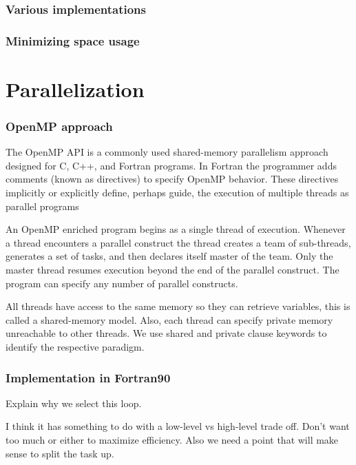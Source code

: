 \subsubsection*{Various implementations}
\subsubsection*{Minimizing space usage}
\section*{Parallelization}
\subsubsection*{OpenMP approach} %
The OpenMP API is a commonly used shared-memory parallelism approach designed for C, C++, and Fortran programs.
In Fortran the programmer adds comments (known as directives) to specify OpenMP behavior.
These directives implicitly or explicitly define, perhaps guide, the execution of multiple threads as parallel programs

An OpenMP enriched program begins as a single thread of execution.
Whenever a thread encounters a parallel construct the thread creates a team of sub-threads, generates a set of tasks, and then declares itself master of the team.
Only the master thread resumes execution beyond the end of the parallel construct.
The program can specify any number of parallel constructs.

All threads have access to the same memory so they can retrieve variables, this is called a shared-memory model.
Also, each thread can specify private memory unreachable to other threads.
We use shared and private clause keywords to identify the respective paradigm.

\subsubsection*{Implementation in Fortran90}
Explain why we select this loop. %

I think it has something to do with a low-level vs high-level trade off. Don't want too much or either to maximize efficiency. Also we need a point that will make sense to split the task up.



